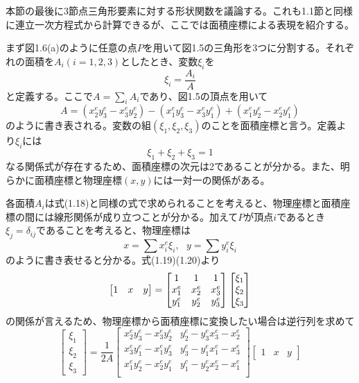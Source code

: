 \documentclass[dvipdfmx, 9pt, a4paper]{jsarticle}
\numberwithin{equation}{section}
\begin{document}
本節の最後に3節点三角形要素に対する形状関数を議論する。これも1.1節と同様に連立一次方程式から計算できるが、ここでは面積座標による表現を紹介する。\par
まず図1.6(a)のように任意の点$P$を用いて図1.5の三角形を3つに分割する。それぞれの面積を$A_i(i=1,2,3)$としたとき、変数$\xi_i$を
\begin{equation}
\xi_i=\frac{A_i}{A}
\end{equation}
と定義する。ここで$A=\sum_iA_i$であり、図1.5の頂点を用いて
\begin{equation}
A=(x^e_2y^e_3-x^e_3y^e_2)-(x^e_1y^e_3-x^e_3y^e_1)+(x^e_1y^e_2-x^e_2y^e_1)
\end{equation}
のように書き表される。変数の組$(\xi_1, \xi_2, \xi_3)$のことを面積座標と言う。定義より$\xi_i$には
\begin{equation}
\xi_1+\xi_2+\xi_3=1
\end{equation}
なる関係式が存在するため、面積座標の次元は2であることが分かる。また、明らかに面積座標と物理座標$(x, y)$には一対一の関係がある。\par
各面積$A_i$は式(1.18)と同様の式で求められることを考えると、物理座標と面積座標の間には線形関係が成り立つことが分かる。加えて$P$が頂点$i$であるとき$\xi_j=\delta_{ij}$であることを考えると、物理座標は
\begin{equation}
x=\sum x^e_i \xi_i,~~~y=\sum y^e_i\xi_i
\end{equation}
のように書き表せると分かる。式(1.19)(1.20)より
\begin{equation}
\begin{bmatrix}
1 & x & y
\end{bmatrix}=
\begin{bmatrix}
1 & 1 & 1 \\
x^e_1 & x^e_2 & x^e_3 \\
y^e_1 & y^e_2 & y^e_3
\end{bmatrix}
\begin{bmatrix}
\xi_1 \\ \xi_2 \\ \xi_3
\end{bmatrix} \notag
\end{equation}
の関係が言えるため、物理座標から面積座標に変換したい場合は逆行列を求めて
\begin{equation}
\begin{bmatrix}
\xi_1 \\ \xi_2 \\ \xi_3
\end{bmatrix}=
\frac{1}{2A}
\begin{bmatrix}
x^e_2y^e_3 - x^e_3y^e_2 & y^e_2 - y^e_3 x^e_3 - x^e_2 \\
x^e_3y^e_1 - x^e_1y^e_3 & y^e_3 - y^e_1 x^e_1 - x^e_3 \\
x^e_1y^e_2 - x^e_2y^e_1 & y^e_1 - y^e_2 x^e_2 - x^e_1 \\
\end{bmatrix}
\begin{bmatrix}
1 & x & y
\end{bmatrix}
\end{equation}
\end{document}

